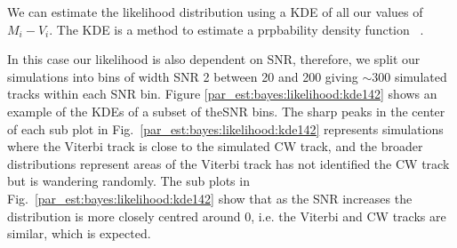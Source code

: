 We can estimate the likelihood distribution using a \gls{KDE}
of all our values of $M_i - V_i$. 
The \gls{KDE} is a method to estimate a prpbability density function 
~.  

In this case our likelihood is also dependent on \gls{SNR},
therefore, we split our simulations into bins of width \gls{SNR}
2 between 20 and 200 giving $\sim 300$
simulated tracks within each \gls{SNR} bin.  Figure
\ref{par_est:bayes:likelihood:kde142} shows an example of the \glspl{KDE} of a
subset of the\gls{SNR} bins. The sharp peaks in the center of
each sub plot in Fig.~\ref{par_est:bayes:likelihood:kde142} represents
simulations where the Viterbi track is close to the simulated \gls{CW} track,
and the broader distributions represent areas of the Viterbi track has not
identified the \gls{CW} track but is wandering randomly.  The sub plots in
Fig.~\ref{par_est:bayes:likelihood:kde142} show that as the \gls{SNR} increases
the distribution is more closely centred around 0, i.e. the Viterbi and
\gls{CW} tracks are similar, which is expected.~
%
